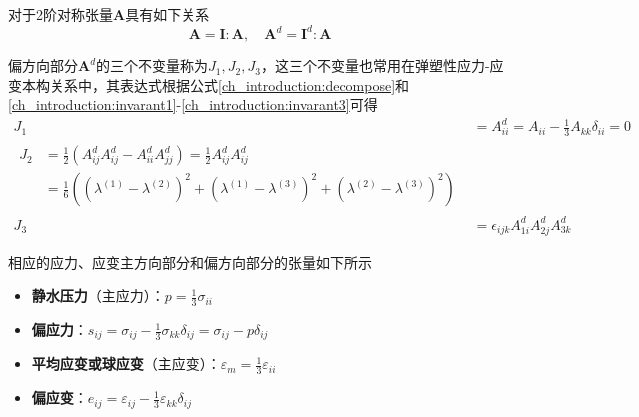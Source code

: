 对于2阶对称张量$\boldsymbol A$具有如下关系
\begin{equation}
    \boldsymbol A = \boldsymbol I : \boldsymbol A, \quad
    \boldsymbol A^d = \boldsymbol I^d : \boldsymbol A
\end{equation}\par
偏方向部分$\boldsymbol A^d$的三个不变量称为$J_1, J_2, J_3$，这三个不变量也常用在弹塑性应力-应变本构关系中，其表达式根据公式\eqref{ch_introduction:decompose}和\eqref{ch_introduction:invarant1}-\eqref{ch_introduction:invarant3}可得
\begin{align}
    J_1 &= A_{ii}^d = A_{ii} - \frac{1}{3} A_{kk} \delta_{ii} = 0 \\
    \begin{split}
        J_2 &= \frac{1}{2}(A_{ij}^dA_{ij}^d - A_{ii}^dA_{jj}^d) = \frac{1}{2} A_{ij}^dA_{ij}^d \\
            &= \frac{1}{6}((\lambda^{(1)}-\lambda^{(2)})^2 + (\lambda^{(1)}-\lambda^{(3)})^2 + (\lambda^{(2)}-\lambda^{(3)})^2)
    \end{split} \\
    J_3 &= \epsilon_{ijk} A_{1i}^d A_{2j}^d A_{3k}^d
\end{align}\par
相应的应力、应变主方向部分和偏方向部分的张量如下所示
\begin{itemize}
    \item \textbf{静水压力}（主应力）：$p = \frac{1}{3}\sigma_{ii}$
    \item \textbf{偏应力}：$s_{ij} = \sigma_{ij} - \frac{1}{3}\sigma_{kk} \delta_{ij} = \sigma_{ij} - p \delta_{ij}$
    \item \textbf{平均应变或球应变}（主应变）：$\varepsilon_m = \frac{1}{3}\varepsilon_{ii}$
    \item \textbf{偏应变}：$e_{ij} = \varepsilon_{ij} - \frac{1}{3}\varepsilon_{kk} \delta_{ij}$
\end{itemize}
